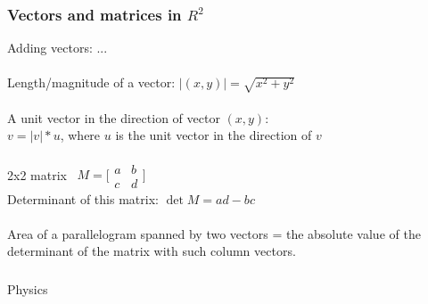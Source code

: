 \documentclass[aspectratio=169,xcolor=pdftex,dvipsnames]{beamer} %
\begin{document}


\begin{frame}
\frametitle{Vectors and matrices in $R^2$}

Adding vectors: ...\\
\ \\
Length/magnitude of a vector: $|(x,y)| = \sqrt{x^2 + y^2}$\\
\ \\
A unit vector in the direction of vector $(x,y)$:\\
$v = |v|*u$, where $u$ is the unit vector in the direction of $v$\\
\ \\
2x2 matrix \ 
$M = \bigl[\begin{smallmatrix} a&b \\ c&d \end{smallmatrix}\bigr]$\\
Determinant of this matrix: $\det M = ad - bc$\\
\ \\
Area of a parallelogram spanned by two vectors 
= the absolute value of the determinant of the matrix with such column vectors.

\end{frame}



\begin{frame}
\frametitle{}

\begin{center}
\Huge{Physics}
\end{center}

\end{frame}

\end{document}
